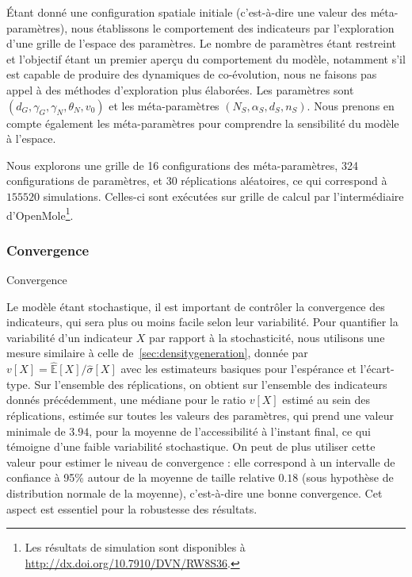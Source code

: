 Étant donné une configuration spatiale initiale (c'est-à-dire une valeur des méta-paramètres), nous établissons le comportement des indicateurs par l'exploration d'une grille de l'espace des paramètres. Le nombre de paramètres étant restreint et l'objectif étant un premier aperçu du comportement du modèle, notamment s'il est capable de produire des dynamiques de co-évolution, nous ne faisons pas appel à des méthodes d'exploration plus élaborées. Les paramètres sont $(d_G,\gamma_G,\gamma_N,\theta_N,v_0)$ et les méta-paramètres $(N_S,\alpha_S,d_S,n_S)$. Nous prenons en compte également les méta-paramètres pour comprendre la sensibilité du modèle à l'espace.

Nous explorons une grille de 16 configurations des méta-paramètres, 324 configurations de paramètres, et 30 réplications aléatoires, ce qui correspond à $155520$ simulations. Celles-ci sont exécutées sur grille de calcul par l'intermédiaire d'OpenMole\footnote{Les résultats de simulation sont disponibles à \url{http://dx.doi.org/10.7910/DVN/RW8S36}.}.



\subsubsection{Convergence}{Convergence}


Le modèle étant stochastique, il est important de contrôler la convergence des indicateurs, qui sera plus ou moins facile selon leur variabilité. Pour quantifier la variabilité d'un indicateur $X$ par rapport à la stochasticité, nous utilisons une mesure similaire à celle de~\ref{sec:densitygeneration}, donnée par $v\left[X\right] = \hat{\mathbb{E}}\left[X\right]/\hat{\sigma}\left[X\right]$ avec les estimateurs basiques pour l'espérance et l'écart-type. Sur l'ensemble des réplications, on obtient sur l'ensemble des indicateurs donnés précédemment, une médiane pour le ratio $v\left[X\right]$ estimé au sein des réplications, estimée sur toutes les valeurs des paramètres, qui prend une valeur minimale de $3.94$, pour la moyenne de l'accessibilité à l'instant final, ce qui témoigne d'une faible variabilité stochastique. On peut de plus utiliser cette valeur pour estimer le niveau de convergence : elle correspond à un intervalle de confiance à 95\% autour de la moyenne de taille relative $0.18$ (sous hypothèse de distribution normale de la moyenne), c'est-à-dire une bonne convergence. Cet aspect est essentiel pour la robustesse des résultats.




